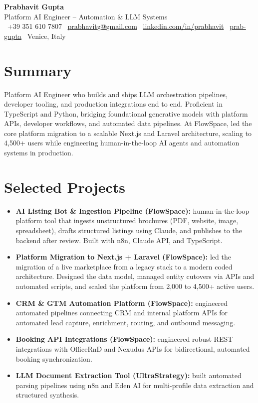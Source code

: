 \documentclass[a4paper,10pt]{article}
\begin{document}
\begin{center}
 {\Huge\bfseries Prabhavit Gupta}\\[3pt]
 {\color{accent}\large Platform AI Engineer -- Automation \& LLM Systems}\\[5pt]
 \faPhone\ +39 351 610 7807 \quad
 \faEnvelope\ \href{mailto:prabhavitg@gmail.com}{prabhavitg@gmail.com} \quad
 \faLinkedin\ \href{https://www.linkedin.com/in/prabhavit/}{linkedin.com/in/prabhavit} \quad
 \faGithub\ \href{https://github.com/prab-gupta}{prab-gupta} \quad
 \faMapMarker*\ Venice, Italy
\end{center}

\section{Summary}
Platform AI Engineer who builds and ships LLM orchestration pipelines, developer tooling, and production integrations end to end. Proficient in TypeScript and Python, bridging foundational generative models with platform APIs, developer workflows, and automated data pipelines. At FlowSpace, led the core platform migration to a scalable Next.js and Laravel architecture, scaling to 4,500+ users while engineering human-in-the-loop AI agents and automation systems in production.

\section{Selected Projects}
\begin{itemize}
 \item \textbf{AI Listing Bot \& Ingestion Pipeline (FlowSpace):} human-in-the-loop platform tool that ingests unstructured brochures (PDF, website, image, spreadsheet), drafts structured listings using Claude, and publishes to the backend after review. Built with n8n, Claude API, and TypeScript.
 \item \textbf{Platform Migration to Next.js + Laravel (FlowSpace):} led the migration of a live marketplace from a legacy stack to a modern coded architecture. Designed the data model, managed entity cutovers via APIs and automated scripts, and scaled the platform from 2,000 to 4,500+ active users.
 \item \textbf{CRM \& GTM Automation Platform (FlowSpace):} engineered automated pipelines connecting CRM and internal platform APIs for automated lead capture, enrichment, routing, and outbound messaging.
 \item \textbf{Booking API Integrations (FlowSpace):} engineered robust REST integrations with OfficeRnD and Nexudus APIs for bidirectional, automated booking synchronization.
 \item \textbf{LLM Document Extraction Tool (UltraStrategy):} built automated parsing pipelines using n8n and Eden AI for multi-profile data extraction and structured synthesis.
\end{itemize}
\end{document}
